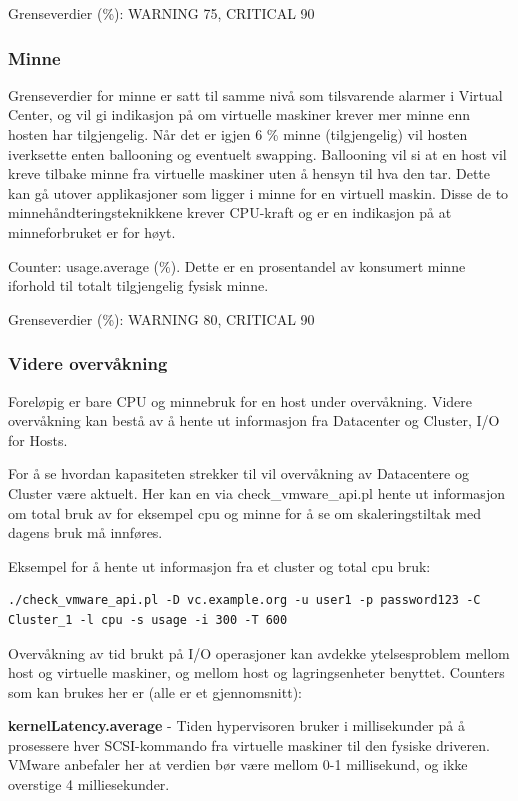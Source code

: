 Grenseverdier (\%): WARNING 75, CRITICAL 90

\subsubsection*{Minne}
Grenseverdier for minne er satt til samme nivå som tilsvarende alarmer i Virtual Center, og vil gi indikasjon på om virtuelle maskiner krever mer minne enn hosten har tilgjengelig. Når det er igjen 6 \% minne (tilgjengelig) vil hosten iverksette enten ballooning og eventuelt swapping. Ballooning vil si at en host vil kreve tilbake minne fra virtuelle maskiner uten å hensyn til hva den tar. Dette kan gå utover applikasjoner som ligger i minne for en virtuell maskin. Disse de to minnehåndteringsteknikkene krever CPU-kraft og er en indikasjon på at minneforbruket er for høyt.

Counter: usage.average (\%). Dette er en prosentandel av konsumert minne iforhold til totalt tilgjengelig fysisk minne.

Grenseverdier (\%): WARNING 80, CRITICAL 90

\subsubsection{Videre overvåkning}
Foreløpig er bare CPU og minnebruk for en host under overvåkning. Videre overvåkning kan bestå av å hente ut informasjon fra  Datacenter og Cluster, I/O for Hosts.

For å se hvordan kapasiteten strekker til vil overvåkning av Datacentere og Cluster være aktuelt. Her kan en via check\_vmware\_api.pl hente ut informasjon om total bruk av for eksempel cpu og minne for å se om skaleringstiltak med dagens bruk må innføres.

Eksempel for å hente ut informasjon fra et cluster og total cpu bruk: 

\begin{lstlisting}
./check_vmware_api.pl -D vc.example.org -u user1 -p password123 -C Cluster_1 -l cpu -s usage -i 300 -T 600
\end{lstlisting}

Overvåkning av tid brukt på I/O operasjoner kan avdekke ytelsesproblem mellom host og virtuelle maskiner, og mellom host og lagringsenheter benyttet. Counters som kan brukes her er (alle er et gjennomsnitt):

{\bf kernelLatency.average} - Tiden hypervisoren bruker i millisekunder på å prosessere hver SCSI-kommando fra virtuelle maskiner til den fysiske driveren. VMware anbefaler her at verdien bør være mellom 0-1 millisekund, og ikke overstige 4 milliesekunder.   
	
